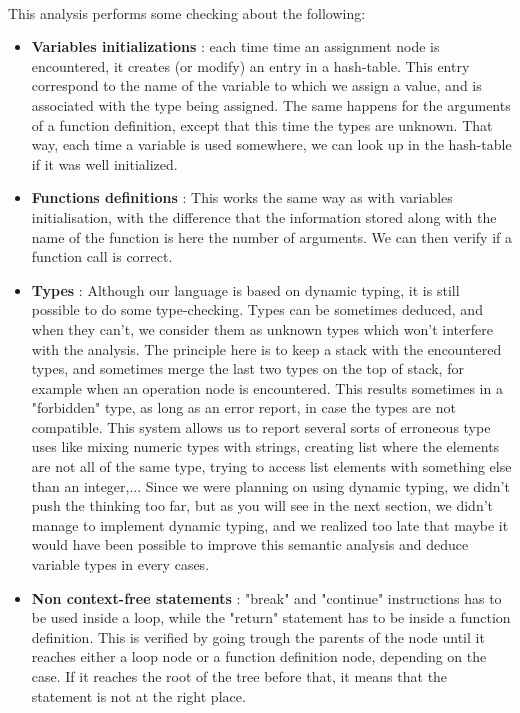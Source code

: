 \documentclass[12pt,a4paper]{article}
\begin{document}
\paragraph{}
This analysis performs some checking about the following:

\begin{itemize}
\item \textbf{Variables initializations} : each time time an assignment node is encountered, it creates (or modify) an entry in a hash-table. This entry correspond to the name of the variable to which we assign a value, and is associated with the type being assigned. The same happens for the arguments of a function definition, except that this time the types are unknown. That way, each time a variable is used somewhere, we can look up in the hash-table if it was well initialized.

\item \textbf{Functions definitions} : This works the same way as with variables initialisation, with the difference that the information stored along with the name of the function is here the number of arguments. We can then verify if a function call is correct. 

\item \textbf{Types} : Although our language is based on dynamic typing, it is still possible to do some type-checking. Types can be sometimes deduced, and when they can't, we consider them as unknown types which won't interfere with the analysis. The principle here is to keep a stack with the encountered types, and sometimes merge the last two types on the top of stack, for example when an operation node is encountered. This results sometimes in a "forbidden" type, as long as an error report, in case the types are not compatible. This system allows us to report several sorts of erroneous type uses like mixing numeric types with strings, creating list where the elements are not all of the same type, trying to access list elements with something else than an integer,...
Since we were planning on using dynamic typing, we didn't push the thinking too far, but as you will see in the next section, we didn't manage to implement dynamic typing, and we realized too late that maybe it would have been possible to improve this semantic analysis and deduce variable types in every cases.   

\item \textbf{Non context-free statements} : "break" and "continue" instructions has to be used inside a loop, while the "return" statement has to be inside a function definition. This is verified by going trough the parents of the node until it reaches either a loop node or a function definition node, depending on the case. If it reaches the root of the tree before that, it means that the statement is not at the right place.
   
\end{itemize}
  
\end{document}
